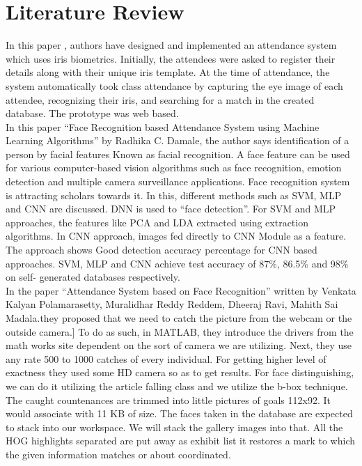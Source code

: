     \chapter{Literature Review}
    In this paper \cite{Iris}, authors  have designed and  implemented an attendance system which uses iris biometrics. Initially, the attendees were asked to register their details along with their unique  iris template.  At the  time of  attendance,  the system automatically  took  class  attendance  by  capturing  the  eye image of each attendee, recognizing their iris, and searching for a match in the  created database. The prototype was web based.
   \\
    In this paper \cite{radhika} “Face Recognition based Attendance System
using Machine Learning Algorithms” by Radhika C.
Damale, the author says identification of a person by facial
features Known as facial recognition. A face feature can be
used for various computer-based vision algorithms such as
face recognition, emotion detection and multiple camera
surveillance applications. Face recognition system is
attracting scholars towards it. In this, different methods
such as SVM, MLP and CNN are discussed. DNN is used
to “face detection”. For SVM and MLP approaches, the
features like PCA and LDA extracted using extraction
algorithms. In CNN approach, images fed directly to CNN Module as a feature. The approach shows Good detection
accuracy percentage for CNN based approaches. SVM,
MLP and CNN achieve test accuracy of 87\%, 86.5\% and
98\% on self- generated databases respectively.
\\
In the paper \cite{Venkata} “Attendance System based on Face
Recognition” written by Venkata Kalyan Polamarasetty,
Muralidhar Reddy Reddem, Dheeraj Ravi, Mahith Sai
Madala.they proposed that we need to catch the picture
from the webcam or the outside camera.] To do as such, in
MATLAB, they introduce the drivers from the math works
site dependent on the sort of camera we are utilizing.
Next, they use any rate 500 to 1000 catches of every
individual. For getting higher level of exactness they used
some HD camera so as to get results. For face
distinguishing, we can do it utilizing the article falling class
and we utilize the b-box technique. The caught
countenances are trimmed into little pictures of goals
112x92. It would associate with 11 KB of size. The faces
taken in the database are expected to stack into our
workspace. We will stack the gallery images into that. All
the HOG highlights separated are put away as exhibit list it
restores a mark to which the given information matches or
about coordinated.